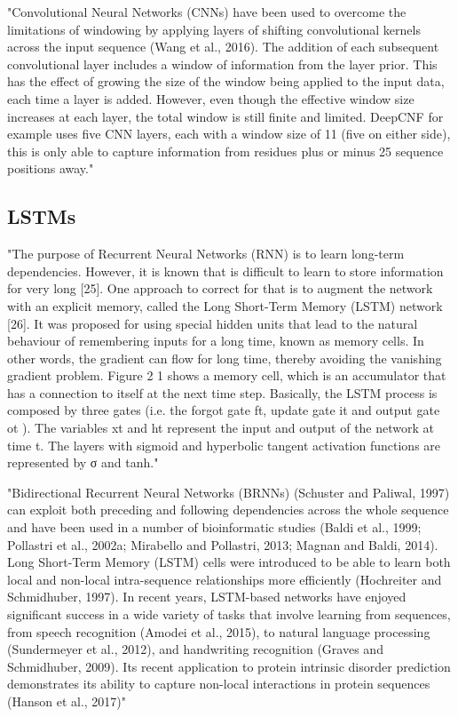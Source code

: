\documentclass[]{scrartcl}
\begin{document}
"Convolutional Neural Networks (CNNs) have been used to overcome the limitations of windowing by applying layers of shifting convolutional kernels across the input sequence (Wang et al., 2016). The addition of each subsequent convolutional layer includes a window of information from the layer prior. This has the effect of growing the size of the window being applied to the input data, each time a layer is added. However, even though the effective window size increases at each layer, the total window is still finite and limited. DeepCNF for example uses five CNN layers, each with a window size of 11 (five on either side), this is only able to capture information from residues plus or minus 25 sequence positions away." \cite{Heffernan2017}

\subsection{LSTMs}
"The purpose of Recurrent Neural Networks (RNN) is to
learn long-term dependencies. However, it is known that is difficult to learn to store information for very long [25]. One approach to correct for that is to augment the network with an explicit memory, called the Long Short-Term Memory (LSTM) network [26]. It was proposed for using special hidden units that lead to the natural behaviour of remembering inputs for a long time, known as memory cells. In other words, the gradient can flow for long time, thereby avoiding the vanishing gradient problem. Figure 2 1 shows a memory cell, which is an accumulator that has a connection to itself at the next time step. Basically, the LSTM process is composed by three gates (i.e. the forgot gate ft, update gate it and output gate ot ). The variables xt and ht represent the input and output of the network at time t. The layers with sigmoid and hyperbolic tangent activation functions are represented by σ and tanh." \cite{Hattori2017}

"Bidirectional Recurrent Neural Networks (BRNNs) (Schuster and Paliwal, 1997) can exploit both preceding and following dependencies across the whole sequence and have been used in a number of bioinformatic studies (Baldi et al., 1999; Pollastri et al., 2002a; Mirabello and Pollastri, 2013; Magnan and Baldi, 2014). Long Short-Term Memory (LSTM) cells were introduced to be able to learn both local and non-local intra-sequence relationships more efficiently (Hochreiter and Schmidhuber, 1997). In recent years, LSTM-based networks have enjoyed significant success in a wide variety of tasks that involve learning from sequences, from speech recognition (Amodei et al., 2015), to natural language processing (Sundermeyer et al., 2012), and handwriting recognition (Graves and Schmidhuber, 2009). Its recent application to protein intrinsic disorder prediction demonstrates its ability to capture non-local interactions in protein sequences (Hanson et al., 2017)" \cite{Heffernan2017}
\end{document}
